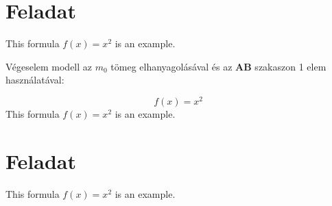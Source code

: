 \documentclass{article}
\begin{document}
	\newpage
	
	\section{Feladat}
	
		This formula $f(x) = x^2$ is an example.
		
		
		
	Végeselem modell az $m_{0}$ tömeg elhanyagolásával és az \textbf{AB} szakaszon 1 elem használatával:
	\begin{figure}[h!]		
		\begin{center}	
		\end{center}	
	\end{figure}
	
	
	\begin{equation}
	f(x)=x^2
	\end{equation}
	This formula $f(x) = x^2$ is an example.
	
	\section{Feladat}
	This formula $f(x) = x^2$ is an example.
	
\end{document}
